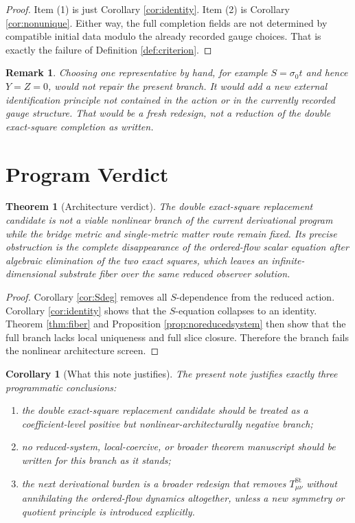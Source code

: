\documentclass[11pt]{article}
\newtheorem{remark}{Remark}
\newtheorem{corollary}{Corollary}
\newtheorem{theorem}{Theorem}
\begin{document}
\begin{proof}
Item (1) is just Corollary \ref{cor:identity}. Item (2) is Corollary \ref{cor:nonunique}. Either way, the full completion fields are not determined by compatible initial data modulo the already recorded gauge choices. That is exactly the failure of Definition \ref{def:criterion}.
\end{proof}

\begin{remark}
Choosing one representative by hand, for example \(S=\sigma_0 t\) and hence \(Y=Z=0\), would not repair the present branch. It would add a new external identification principle not contained in the action or in the currently recorded gauge structure. That would be a fresh redesign, not a reduction of the double exact-square completion as written.
\end{remark}

\section{Program Verdict}

\begin{theorem}[Architecture verdict]
\label{thm:verdict}
The double exact-square replacement candidate is not a viable nonlinear branch of the current derivational program while the bridge metric and single-metric matter route remain fixed. Its precise obstruction is the complete disappearance of the ordered-flow scalar equation after algebraic elimination of the two exact squares, which leaves an infinite-dimensional substrate fiber over the same reduced observer solution.
\end{theorem}

\begin{proof}
Corollary \ref{cor:Sdeg} removes all \(S\)-dependence from the reduced action. Corollary \ref{cor:identity} shows that the \(S\)-equation collapses to an identity. Theorem \ref{thm:fiber} and Proposition \ref{prop:noreducedsystem} then show that the full branch lacks local uniqueness and full slice closure. Therefore the branch fails the nonlinear architecture screen.
\end{proof}

\begin{corollary}[What this note justifies]
\label{cor:stop}
The present note justifies exactly three programmatic conclusions:
\begin{enumerate}
    \item the double exact-square replacement candidate should be treated as a coefficient-level positive but nonlinear-architecturally negative branch;
    \item no reduced-system, local-coercive, or broader theorem manuscript should be written for this branch as it stands;
    \item the next derivational burden is a broader redesign that removes \(T_{\mu\nu}^{\mathrm{St}}\) without annihilating the ordered-flow dynamics altogether, unless a new symmetry or quotient principle is introduced explicitly.
\end{enumerate}
\end{corollary}
\end{document}
